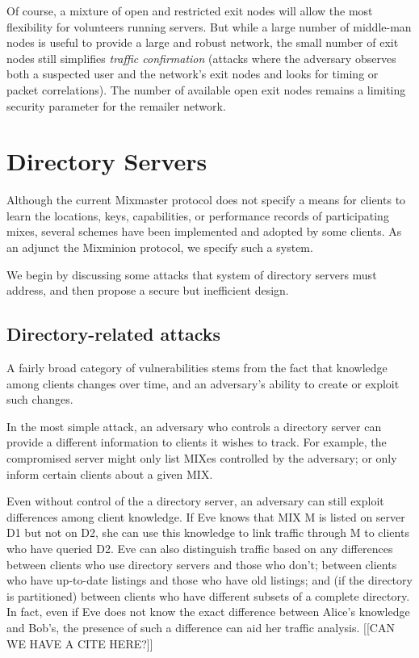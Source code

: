 \documentclass{llncs}
\begin{document}
Of course, a mixture of open and restricted exit nodes will allow the
most flexibility for volunteers running servers. But while a large number
of middle-man nodes is useful to provide a large and robust network, the
small number of exit nodes still simplifies \emph{traffic confirmation}
(attacks where the adversary observes both a suspected user and the
network's exit nodes and looks for timing or packet correlations). The
number of available open exit nodes remains a limiting security parameter
for the remailer network.


\section{Directory Servers}
\label{sec:dir-servers}

Although the current Mixmaster protocol does not specify a means for
clients to learn the locations, keys, capabilities, or performance
records of participating mixes, several schemes have been implemented
\cite{mix-stats} and adopted by some clients.  As an adjunct the
Mixminion protocol, we specify such a system.

We begin by discussing some attacks that system of directory servers
must address, and then propose a secure but inefficient design.

\subsection{Directory-related attacks}
\label{subsec:dir-server-attacks}

A fairly broad category of vulnerabilities stems from the fact that
knowledge among clients changes over time, and an adversary's ability
to create or exploit such changes.

In the most simple attack, an adversary who controls a directory
server can provide a different information to clients it wishes to
track.  For example, the compromised server might only list MIXes
controlled by the adversary; or only inform certain clients about a
given MIX. 

Even without control of the a directory server, an adversary can still
exploit differences among client knowledge.  If Eve knows that MIX M
is listed on server D1 but not on D2, she can use this knowledge to
link traffic through M to clients who have queried D2.  Eve can also
distinguish traffic based on any differences between clients who use
directory servers and those who don't; between clients who have
up-to-date listings and those who have old listings; and (if the
directory is partitioned) between clients who have different subsets
of a complete directory.  In fact, even if Eve does not know the exact
difference between Alice's knowledge and Bob's, the presence of such a
difference can aid her traffic analysis. [[CAN WE HAVE A CITE HERE?]]
\end{document}
